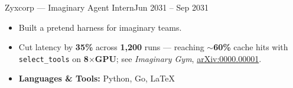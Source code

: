 \documentclass[]{fixturecv}
\begin{document}
\begin{cvsubsection}{Zyxcorp \textnormal{--- Imaginary Agent Intern}}{}{Jun 2031 -- Sep 2031}
  \begin{itemize}
    \item Built a pretend harness for imaginary teams.
    \item Cut latency by \textbf{35\%} across \textbf{1{,}200} runs --- reaching \textbf{$\sim$60\%} cache hits with \texttt{select\_tools} on \textbf{8$\times$GPU}; see \textit{Imaginary Gym}, \href{https://arxiv.org/abs/0000.00001}{arXiv:0000.00001}.
    \item \textbf{Languages \& Tools:} Python, Go, \LaTeX %
  \end{itemize}
\end{cvsubsection}
\end{document}
